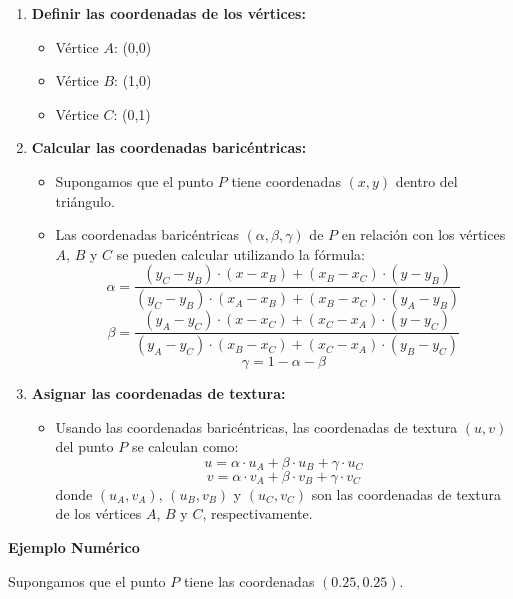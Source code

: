 \documentclass{article}
\begin{document}
\begin{enumerate}
    \item \textbf{Definir las coordenadas de los vértices:}
    \begin{itemize}
        \item Vértice $A$: (0,0)
        \item Vértice $B$: (1,0)
        \item Vértice $C$: (0,1)
    \end{itemize}
    \item \textbf{Calcular las coordenadas baricéntricas:}
    \begin{itemize}
        \item Supongamos que el punto $P$ tiene coordenadas $(x, y)$ dentro del triángulo.
        \item Las coordenadas baricéntricas $(\alpha, \beta, \gamma)$ de $P$ en relación con los vértices $A$, $B$ y $C$ se pueden calcular utilizando la fórmula:
        \[
        \alpha = \frac{(y_C - y_B) \cdot (x - x_B) + (x_B - x_C) \cdot (y - y_B)}{(y_C - y_B) \cdot (x_A - x_B) + (x_B - x_C) \cdot (y_A - y_B)}
        \]
        \[
        \beta = \frac{(y_A - y_C) \cdot (x - x_C) + (x_C - x_A) \cdot (y - y_C)}{(y_A - y_C) \cdot (x_B - x_C) + (x_C - x_A) \cdot (y_B - y_C)}
        \]
        \[
        \gamma = 1 - \alpha - \beta
        \]
    \end{itemize}
    \item \textbf{Asignar las coordenadas de textura:}
    \begin{itemize}
        \item Usando las coordenadas baricéntricas, las coordenadas de textura $(u, v)$ del punto $P$ se calculan como:
        \[
        u = \alpha \cdot u_A + \beta \cdot u_B + \gamma \cdot u_C
        \]
        \[
        v = \alpha \cdot v_A + \beta \cdot v_B + \gamma \cdot v_C
        \]
        donde $(u_A, v_A)$, $(u_B, v_B)$ y $(u_C, v_C)$ son las coordenadas de textura de los vértices $A$, $B$ y $C$, respectivamente.
    \end{itemize}
\end{enumerate}

\textbf{Ejemplo Numérico}

Supongamos que el punto $P$ tiene las coordenadas $(0.25, 0.25)$.
\end{document}
